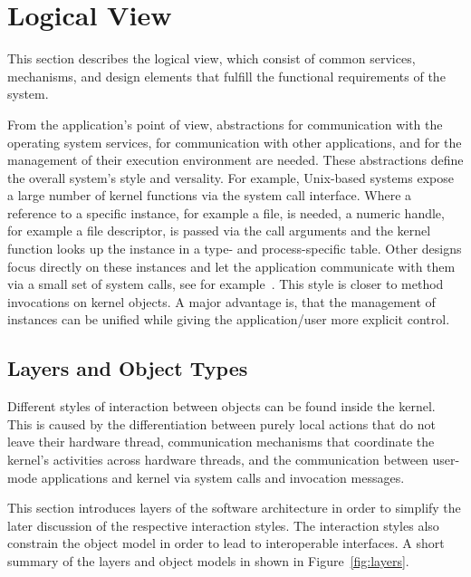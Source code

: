 \section{Logical View}
\label{sec:global-logical-view}

This section describes the logical view, which consist of common services, mechanisms, and design elements that fulfill the functional requirements of the system.

From the application's point of view, abstractions for communication with the operating system services, for communication with other applications, and for the management of their execution environment are needed. These abstractions define the overall system's style and versality.
For example, Unix-based systems expose a large number of kernel functions via the system call interface. Where a reference to a specific instance, for example a file, is needed, a numeric handle, for example a file descriptor, is passed via the call arguments and the kernel function looks up the instance in a type- and process-specific table.
Other designs focus directly on these instances and let the application communicate with them via a small set of system calls, see for example~\cite{Liedtke1996}. This style is closer to method invocations on kernel objects. A major advantage is, that the management of instances can be unified while giving the application/user more explicit control.

\subsection{Layers and Object Types}
\label{sec:vert-layer}
Different styles of interaction between objects can be found inside the kernel. This is caused by the differentiation between purely local actions that do not leave their hardware thread, communication mechanisms that coordinate the kernel's activities across hardware threads, and the communication between user-mode applications and kernel via system calls and invocation messages.

This section introduces layers of the software architecture in order to simplify the later discussion of the respective interaction styles. The interaction styles also constrain the object model in order to lead to interoperable interfaces. A short summary of the layers and object models in shown in Figure~\ref{fig:layers}.

